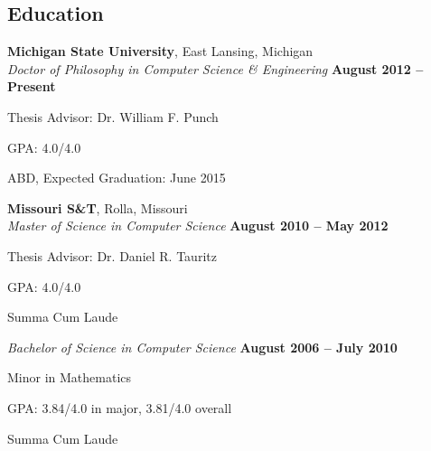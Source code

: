 \documentclass[margin,line]{resume}
\begin{document}
\begin{resume}
    \section{\mysidestyle Education}
    \textbf{Michigan State University}, East Lansing, Michigan \vspace{2mm}\\\vspace{1mm}%
    \textsl{Doctor of Philosophy in Computer Science \& Engineering} \hfill \textbf{ August 2012 -- Present}\vspace{-3mm}\\\vspace{-1mm}%
    \begin{list2}
        \item Thesis Advisor:  Dr. William F. Punch
        \item GPA: 4.0/4.0
        \item ABD, Expected Graduation: June 2015
    \end{list2}\vspace{-1.5mm}
    \textbf{Missouri S\&T}, Rolla, Missouri \vspace{2mm}\\\vspace{1mm}%
    \textsl{Master of Science in Computer Science} \hfill \textbf{ August 2010 -- May 2012}\vspace{-3mm}\\\vspace{-1mm}%
    \begin{list2}
        \item Thesis Advisor:  Dr. Daniel R. Tauritz
        \item GPA: 4.0/4.0
        \item Summa Cum Laude
    \end{list2}\vspace{-1.5mm}
    \textsl{Bachelor of Science in Computer Science} \hfill \textbf{ August 2006 -- July 2010}\vspace{-3mm}\\\vspace{-1mm}%
    \begin{list2}
        \item Minor in Mathematics
        \item GPA: 3.84/4.0 in major, 3.81/4.0 overall
        \item Summa Cum Laude
    \end{list2}\vspace{-1.5mm}


\end{resume}
\end{document}
